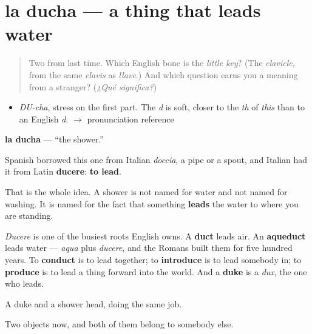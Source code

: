 \section[la ducha]{la ducha — a thing that leads water}

\label{lesson:ES-C310-ducha}



\begin{quote}
Two from last time. Which English bone is the \emph{little key}? (The \emph{clavicle}, from the same \emph{clavis} as \emph{llave}.) And which question earns you a meaning from a stranger? (\emph{¿Qué significa?})
\end{quote}

\begin{sounds}
\begin{itemize}
\raggedright
  \item \emph{DU-cha}, stress on the first part. The \emph{d} is soft, closer to the \emph{th} of \emph{this} than to an English \emph{d}. $\to$ pronunciation reference
\end{itemize}
\end{sounds}

\begin{cousinweb}
\textbf{la ducha} — \textquotedblleft{}the shower.\textquotedblright{}

Spanish borrowed this one from Italian \emph{doccia}, a pipe or a spout, and Italian had it from Latin \textbf{ducere}: \textbf{to lead}.

That is the whole idea. A shower is not named for water and not named for washing. It is named for the fact that something \textbf{leads} the water to where you are standing.

\emph{Ducere} is one of the busiest roots English owns. A \textbf{duct} leads air. An \textbf{aqueduct} leads water — \emph{aqua} plus \emph{ducere}, and the Romans built them for five hundred years. To \textbf{conduct} is to lead together; to \textbf{introduce} is to lead somebody in; to \textbf{produce} is to lead a thing forward into the world. And a \textbf{duke} is a \emph{dux}, the one who leads.

A duke and a shower head, doing the same job.
\end{cousinweb}

\begin{grammarlens}[title={What you've built}]
Two objects now, and both of them belong to somebody else.
\end{grammarlens}

